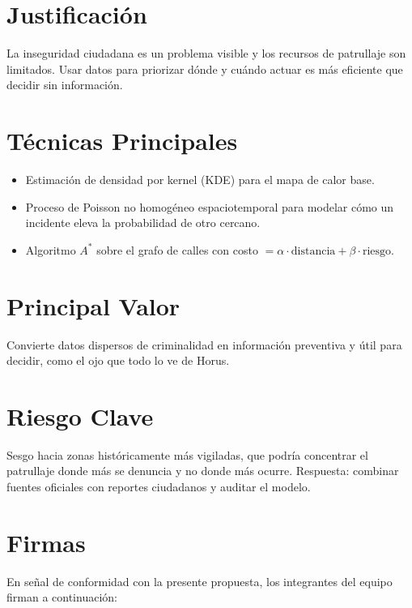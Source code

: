 \documentclass[11pt,a4paper]{article}
\begin{document}
\section{Justificación}
La inseguridad ciudadana es un problema visible y los recursos de patrullaje son limitados. Usar datos para priorizar dónde y cuándo actuar es más eficiente que decidir sin información.

\section{Técnicas Principales}
\begin{itemize}[leftmargin=*]
    \item Estimación de densidad por kernel (KDE) para el mapa de calor base.
    \item Proceso de Poisson no homogéneo espaciotemporal para modelar cómo un incidente eleva la probabilidad de otro cercano.
    \item Algoritmo $A^*$ sobre el grafo de calles con costo $= \alpha \cdot \text{distancia} + \beta \cdot \text{riesgo}$.
\end{itemize}

\section{Principal Valor}
Convierte datos dispersos de criminalidad en información preventiva y útil para decidir, como el ojo que todo lo ve de Horus.

\section{Riesgo Clave}
Sesgo hacia zonas históricamente más vigiladas, que podría concentrar el patrullaje donde más se denuncia y no donde más ocurre. Respuesta: combinar fuentes oficiales con reportes ciudadanos y auditar el modelo.

\section{Firmas}
\noindent En señal de conformidad con la presente propuesta, los integrantes del equipo firman a continuación:
\end{document}

